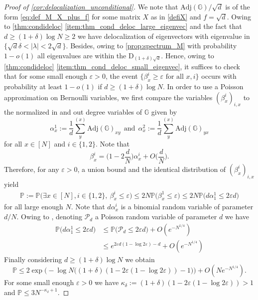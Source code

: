 \documentclass[11pt]{article}
\newcommand{\eps}{\varepsilon}
\theoremstyle{plain}
\theoremstyle{remark}
\numberwithin{equation}{section}
\newcommand{\nc}{\normalcolor}
\begin{document}
	
	\begin{proof}[Proof of \cref{cor:delocalization_unconditional}] 
	We note that $\mathrm{Adj}(\mathbb G)/\sqrt{d}$ is of the form \eqref{eq:def_M_X_plus_f} for some matrix $X$ as in \cref{defiX} and $f = \sqrt{d}$. Owing to \cref{thm:condideloc} \cref{item:thm_cond_deloc_large_eigenvec} and the fact that $d \geq (1+\delta) \log N \ge 2$ we have delocalization of eigenvectors with eigenvalue in $\{\sqrt{d}\delta < |\lambda| < 2 \sqrt{d}\} $. Besides, owing to \cref{prop:spectrum_M} with probability $1 - o(1)$ all eigenvalues are within the $\mathrm{D}_{(1+\delta) \sqrt{d}}$. \nc Hence, owing to \cref{thm:condideloc} \cref{item:thm_cond_deloc_small_eigenvec}, 
		it suffices to check 
		that for some small enough $\eps>0$,  the event $\{ \beta_x^i \geq \eps \text{ for all } x,i \}$ occurs with probability at least $1-o(1)$ if $d \geq (1 + \delta) \log N$. In order to use a Poisson approximation on Bernoulli variables, we first compare the variables $(\beta_{x}^i)_{i,x}$ to the normalized in and out degree variables of  $\mathbb{G}$ given by 
		\begin{equation*}
			\alpha_{x}^1 := \frac{1}{d} \sum_{y}^{(x)} \mathrm{Adj}(\mathbb G)_{xy}  ~~\text{and}~~\alpha_{x}^2 := \frac{1}{d} \sum_{y}^{(x)} \mathrm{Adj}(\mathbb G)_{yx}
		\end{equation*}
	 for all $x \in [N]$ and $i\in \{1,2\}$. Note that  
		\begin{equation*}
			\beta_{x}^i = \biggl(1-2 \frac{d}{N}\biggr)\alpha_{x}^i +   O\bigg(\frac{d}{N}\bigg). 
		\end{equation*}
	Therefore, for any $\eps >0$, a union bound and the identical distribution of  $(\beta_x^i)_{i,x}$ yield 
		\begin{align*}
			\mathbb{P}:= \mathbb{P}\big( \exists x \in [N], i \in \{1,2\},~ \beta_{x}^i \le \eps  \big) \le 2N \mathbb{P}\big(\beta_x^1 \le \eps \big) \le 2N\mathbb{P} \big( d \alpha_1^1 \le 2 \eps d\big)
		\end{align*}
		 for all large enough $N$. 
		Note that $d\alpha_x^i$ is a binomial random variable of parameter $d/N$. Owing to \cite[Lemma D.3]{alt2023poisson}, denoting $\mathcal P_{d}$ a Poisson random variable of parameter $d$ we have
		\begin{align*}
			\mathbb{P} \big( d \alpha_1^1 \le 2 \eps d\big) &\le \mathbb{P} \big(\mathcal{P}_d \le 2 \eps d\big) +  O (e^{-N^{1/4}})\\
			&\le e^{2\eps d(1- \log 2\eps) -d} +  O (e^{-N^{1/4}})
		\end{align*}
		Finally considering $d \ge (1+ \delta) \log N$ we obtain 
		\begin{equation*}
			\mathbb{P}\le 2 \exp\big(-\log N \big( (1+ \delta ) (1 - 2 \eps ( 1- \log2\eps)) -1 \big)\big) +  O ( N e^{-N^{1/4}}).
		\end{equation*}
		For some small enough $\eps>0$  we have $\kappa_{\delta} :=(1+ \delta ) (1 - 2 \eps ( 1- \log2\eps)) >1 $ and $\mathbb{P} \le 3N^{-\kappa_{\delta} +1}$.
	\end{proof} 
	
\end{document}

